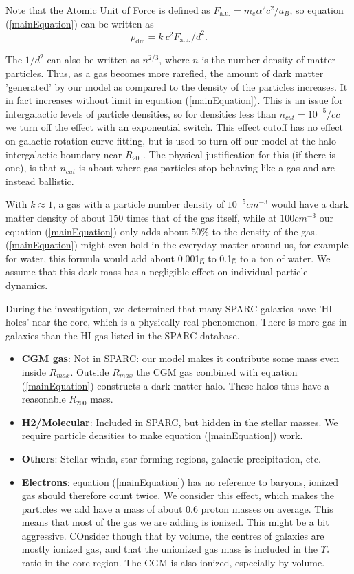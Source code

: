 \documentclass[fleqn,usenatbib]{mnras}
\begin{document}
Note that the Atomic Unit of Force is defined as $F_{\text{a.u.}} = m_e \alpha^2 c^2/{a_B} $, so equation (\ref{mainEquation}) can be written as 
\begin{equation} \label{mainEquation}
    \rho_{\text{dm}} =k\ c^2 F_{\text{a.u.}}/d^2.
    \qquad
\end{equation}

The $1/d^2$ can also be written as  $n^{2/3}$, where $n$ is the number density of matter particles. Thus, as a gas becomes more rarefied, the amount of dark matter 'generated' by our model as compared to the density of the particles increases. It in fact increases without limit in equation (\ref{mainEquation}). This is an issue for intergalactic levels of particle densities, so for densities less than $n_{cut} = 10^{-5}/cc$ we turn off the effect with an exponential switch. This effect cutoff has no effect on galactic rotation curve fitting, but is used to turn off our model at the halo - intergalactic boundary near $R_{200}$. The physical justification for this (if there is one), is that $n_{cut}$ is about where gas particles stop behaving like a gas and are instead ballistic.  

With $k \approx	1$, a gas with a particle number density of $10^{-5}cm^{-3}$ would have a dark matter density of about 150 times that of the gas itself, while at $100 cm^{-3}$ our equation (\ref{mainEquation}) only adds about $50\%$ to the density of the gas. (\ref{mainEquation}) might even hold in the everyday matter around us, for example for water, this formula would add about 0.001g to 0.1g to a ton of water. We assume that this dark mass has a negligible effect on individual particle dynamics. 

During the investigation, we determined that many SPARC galaxies have 'HI holes' near the core, which is a physically real phenomenon. There is more gas in galaxies than the HI gas listed in the SPARC database. 

\begin{itemize}
	\item \textbf{CGM gas}: Not in SPARC: our model makes it contribute some mass even inside $R_{max}$. Outside $R_{max}$ the CGM gas combined with equation (\ref{mainEquation}) constructs a dark matter halo. These halos thus have a reasonable $R_{200}$ mass.  
	\item \textbf{H2/Molecular}: Included in SPARC, but hidden in the stellar masses. We require particle densities to make equation (\ref{mainEquation}) work. 
	\item \textbf{Others}: Stellar winds, star forming regions, galactic precipitation, etc. 
	\item \textbf{Electrons}: equation (\ref{mainEquation}) has no reference to baryons, ionized gas should therefore count twice. We consider this effect, which makes the particles we add have a mass of about 0.6 proton masses on average. This means that most of the gas we are adding is ionized. This might be a bit aggressive. COnsider though that by volume, the centres of galaxies are mostly ionized gas, and that the unionized gas mass is included in the $\Upsilon_{*}$ ratio in the core region. The CGM is also ionized, especially by volume.   
\end{itemize}
\end{document}
